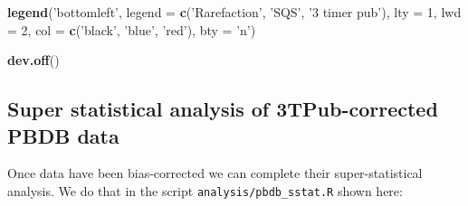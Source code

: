 \documentclass[]{article}
\newenvironment{Shaded}{\begin{snugshade}}{\end{snugshade}}
\newcommand{\KeywordTok}[1]{\textcolor[rgb]{0.13,0.29,0.53}{\textbf{#1}}}
\newcommand{\DataTypeTok}[1]{\textcolor[rgb]{0.13,0.29,0.53}{#1}}
\newcommand{\DecValTok}[1]{\textcolor[rgb]{0.00,0.00,0.81}{#1}}
\newcommand{\StringTok}[1]{\textcolor[rgb]{0.31,0.60,0.02}{#1}}
\newcommand{\NormalTok}[1]{#1}
\begin{document}
\begin{Shaded}
\begin{Highlighting}[]
\KeywordTok{legend}\NormalTok{(}\StringTok{'bottomleft'}\NormalTok{, }\DataTypeTok{legend =} \KeywordTok{c}\NormalTok{(}\StringTok{'Rarefaction'}\NormalTok{, }\StringTok{'SQS'}\NormalTok{, }\StringTok{'3 timer pub'}\NormalTok{), }
       \DataTypeTok{lty =} \DecValTok{1}\NormalTok{, }\DataTypeTok{lwd =} \DecValTok{2}\NormalTok{, }\DataTypeTok{col =} \KeywordTok{c}\NormalTok{(}\StringTok{'black'}\NormalTok{, }\StringTok{'blue'}\NormalTok{, }\StringTok{'red'}\NormalTok{), }\DataTypeTok{bty =} \StringTok{'n'}\NormalTok{)}

\KeywordTok{dev.off}\NormalTok{()}
\end{Highlighting}
\end{Shaded}

\subsection{Super statistical analysis of 3TPub-corrected PBDB
data}\label{super-statistical-analysis-of-3tpub-corrected-pbdb-data}

Once data have been bias-corrected we can complete their
super-statistical analysis. We do that in the script
\texttt{analysis/pbdb\_sstat.R} shown here:
\end{document}
